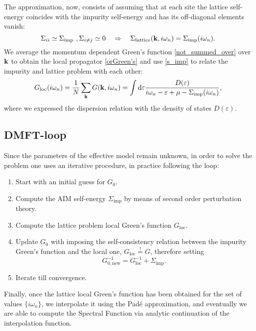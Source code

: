 The approximation, now, consists of assuming that at each site the lattice self-energy coincides with the impurity self-energy and has its off-diagonal elements vanish:
%
\begin{equation}
\Sigma_{ii} \simeq \Sigma_{\text{imp}} ~ , \Sigma_{i\neq j} \simeq 0
\quad \Rightarrow
\quad
\Sigma_{\text{lattice}}(\bold{k},i\omega_n) = \Sigma_{\text{imp}}(i\omega_n)
.
\end{equation}
%
We average the momentum dependent Green's function \eqref{not_summed_over} over $\bold{k}$ to obtain the local propagator \eqref{orGreen's} and use \eqref{s_imp} to relate the impurity and lattice problem with each other:
%
\begin{equation} \label{Gloc_dos}
G_{\text{loc}}(i\omega_n) = \frac{1}{N} \sum_{\bold{k}} G(\bold{k},i\omega_n) 
 = \int \dif \varepsilon \frac{D(\varepsilon)}{i\omega_n - \varepsilon + \mu - \Sigma_{\text{imp}}(i\omega_n)},
\end{equation}
%
where we expressed the dispersion relation with the density of states $D(\varepsilon)$.
\subsection*{DMFT-loop}
Since the parameters of the effective model remain unknown, in order to solve the problem one uses an iterative procedure, in practice following the loop: 
\begin{enumerate}
\item Start with an initial guess for $G_0$.
\item Compute the AIM self-energy $\Sigma_{\text{imp}}$ by means of second order perturbation theory.
\item Compute the lattice problem local Green's function $G_{\text{loc}}$.
\item Update $G_0$ with imposing the self-consistency relation between the impurity Green's function and the local one, $G_{\text{loc}} \overset{!}{=} G$, therefore setting
  \begin{equation}
G_{0,\text{new}}^{-1} = G_{\text{loc}}^{-1} + \Sigma_{\text{imp}}.
\label{eq:updateG0}
  \end{equation}
\item Iterate till convergence.
\end{enumerate}
Finally, once the lattice local Green's function has been obtained for the set of values $\{i\omega_n\}$, we interpolate it using the Padé approximation, and eventually we are able to compute the Spectral Function via analytic continuation of the interpolation function.


